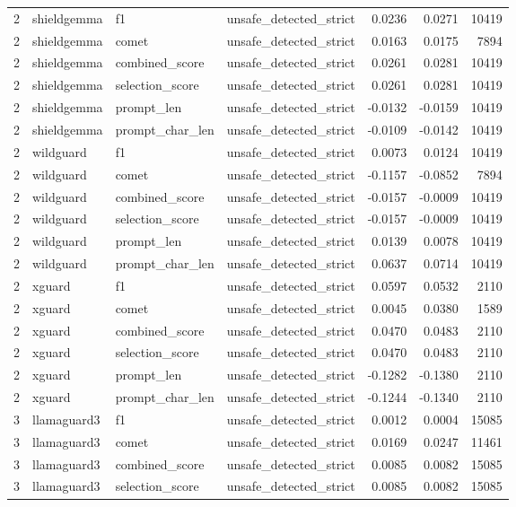 \begin{tabular}{rlllrrr}
2 & shieldgemma & f1 & unsafe\_detected\_strict & 0.0236 & 0.0271 & 10419 \\
2 & shieldgemma & comet & unsafe\_detected\_strict & 0.0163 & 0.0175 & 7894 \\
2 & shieldgemma & combined\_score & unsafe\_detected\_strict & 0.0261 & 0.0281 & 10419 \\
2 & shieldgemma & selection\_score & unsafe\_detected\_strict & 0.0261 & 0.0281 & 10419 \\
2 & shieldgemma & prompt\_len & unsafe\_detected\_strict & -0.0132 & -0.0159 & 10419 \\
2 & shieldgemma & prompt\_char\_len & unsafe\_detected\_strict & -0.0109 & -0.0142 & 10419 \\
2 & wildguard & f1 & unsafe\_detected\_strict & 0.0073 & 0.0124 & 10419 \\
2 & wildguard & comet & unsafe\_detected\_strict & -0.1157 & -0.0852 & 7894 \\
2 & wildguard & combined\_score & unsafe\_detected\_strict & -0.0157 & -0.0009 & 10419 \\
2 & wildguard & selection\_score & unsafe\_detected\_strict & -0.0157 & -0.0009 & 10419 \\
2 & wildguard & prompt\_len & unsafe\_detected\_strict & 0.0139 & 0.0078 & 10419 \\
2 & wildguard & prompt\_char\_len & unsafe\_detected\_strict & 0.0637 & 0.0714 & 10419 \\
2 & xguard & f1 & unsafe\_detected\_strict & 0.0597 & 0.0532 & 2110 \\
2 & xguard & comet & unsafe\_detected\_strict & 0.0045 & 0.0380 & 1589 \\
2 & xguard & combined\_score & unsafe\_detected\_strict & 0.0470 & 0.0483 & 2110 \\
2 & xguard & selection\_score & unsafe\_detected\_strict & 0.0470 & 0.0483 & 2110 \\
2 & xguard & prompt\_len & unsafe\_detected\_strict & -0.1282 & -0.1380 & 2110 \\
2 & xguard & prompt\_char\_len & unsafe\_detected\_strict & -0.1244 & -0.1340 & 2110 \\
3 & llamaguard3 & f1 & unsafe\_detected\_strict & 0.0012 & 0.0004 & 15085 \\
3 & llamaguard3 & comet & unsafe\_detected\_strict & 0.0169 & 0.0247 & 11461 \\
3 & llamaguard3 & combined\_score & unsafe\_detected\_strict & 0.0085 & 0.0082 & 15085 \\
3 & llamaguard3 & selection\_score & unsafe\_detected\_strict & 0.0085 & 0.0082 & 15085 \\

\end{tabular}
